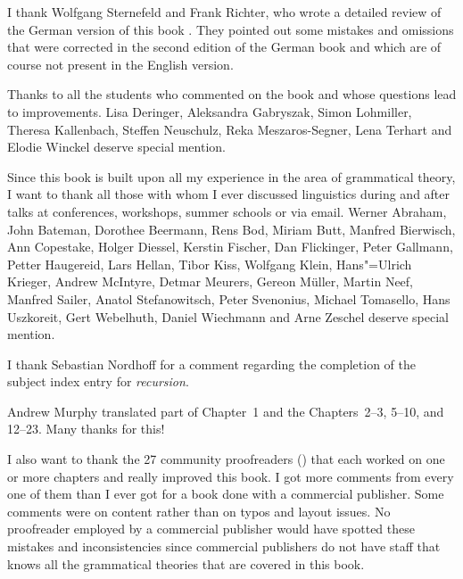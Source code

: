 I thank Wolfgang Sternefeld and Frank Richter, who wrote a detailed review of the German version of
this book \citep{SR2012a}. They pointed out some mistakes and omissions that were corrected in the second edition
of the German book and which are of course not present in the English version.

Thanks to all the students who commented on the book and whose questions lead to improvements. 
Lisa Deringer,
Aleksandra Gabryszak, %
Simon Lohmiller, %
Theresa Kallenbach, %
Steffen Neu\-schulz,  %
Reka Meszaros-Segner,
Lena Terhart and
Elodie Winckel deserve special mention.

Since this book is built upon all my experience in the area of grammatical theory, I want to thank
all those with whom I ever discussed linguistics during and after talks at conferences, workshops,
summer schools or via email.
Werner Abraham,
John Bateman,
Dorothee Beermann, 
Rens Bod, 
Miriam Butt,
Manfred Bierwisch,
Ann Copestake, 
Holger Diessel, 
Kerstin Fischer,
Dan Flickinger,
Peter Gallmann, 
Petter Haugereid,
Lars Hellan, 
Tibor Kiss,
Wolfgang Klein, 
Hans"=Ulrich Krieger,
Andrew McIntyre,
Detmar Meurers,
Gereon Müller,
Martin Neef,
Manfred Sailer, 
Anatol Stefanowitsch,
Peter Svenonius,
Michael Tomasello, 
Hans Uszkoreit, 
Gert Webelhuth, 
Daniel Wiechmann and Arne Zeschel deserve special mention.

I thank Sebastian Nordhoff for a comment regarding the completion of the subject index entry for \emph{recursion}.

Andrew Murphy translated part of Chapter~1 and the Chapters~2--3, 5--10, and 12--23. Many thanks for this!

I also want to thank the 27 community proofreaders (\makeatletter\@proofreader\makeatother) that each worked on one or more chapters and
really improved this book. I got more comments from every one of them than I ever got for a book
done with a commercial publisher. Some comments were on content rather than on typos and layout
issues. No proofreader employed by a commercial publisher would have spotted these mistakes and
inconsistencies since commercial publishers do not have staff that knows all the grammatical
theories that are covered in this book. 

